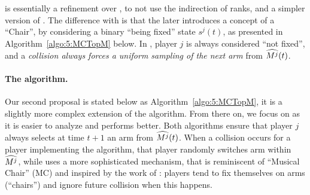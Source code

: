 \RandTopM{} is essentially a refinement over \RhoRand, to not use the indirection of ranks, and a simpler version of \MCTopM.
The difference with \MCTopM{} is that the later introduces a concept of a ``Chair'', by considering a binary ``being fixed'' state $s^j(t)$, as presented in Algorithm~\ref{algo:5:MCTopM} below.
%
In \RandTopM{}, player $j$ is always considered ``not fixed'',
and a \emph{collision always forces a uniform sampling of the next arm} from $\widehat{M^j}(t)$.




\paragraph{The \MCTopM{} algorithm.}
%
Our second proposal \MCTopM{} is stated below as Algorithm~\ref{algo:5:MCTopM},
it is a slightly more complex extension of the \RandTopM{} algorithm.
From there on, we focus on \MCTopM{} as it is easier to analyze and performs better.
%
Both algorithms ensure that player $j$ always
selects at time $t+1$ an arm from $\widehat{M^j}(t)$.
When a collision occurs for a player implementing the \RandTopM{} algorithm, that player randomly switches arm within $\widehat{M^j}$, while \MCTopM{} uses a more sophisticated mechanism, that is reminiscent of ``Musical Chair'' (MC) and inspired by the work of \cite{Rosenski16}: players tend to fix themselves on arms (``chairs'') and ignore future collision when this happens.


